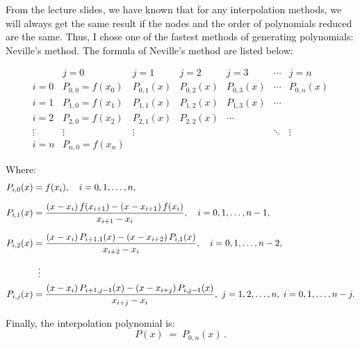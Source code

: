 \documentclass[11pt]{article}
\begin{document}
From the lecture slides, we have known that for any interpolation methods, we will always get the same result if the nodes and
the order of polynomials reduced are the same. Thus, I chose one of the fastest methods of generating polynomials: Neville's method.
The formula of Neville's method are listed below:


\begin{equation}\label{eq:neville-triangle}
\begin{array}{c|cccccc}
   & j=0     & j=1         & j=2           & j=3           & \cdots & j=n      \\ \hline
i=0 & P_{0,0}=f(x_0)
       & P_{0,1}(x)
                    & P_{0,2}(x)
                                  & P_{0,3}(x)
                                                & \cdots & P_{0,n}(x) \\[1ex]
i=1 & P_{1,0}=f(x_1)
       & P_{1,1}(x)
                    & P_{1,2}(x)
                                  & P_{1,3}(x)
                                                & \cdots &          \\[1ex]
i=2 & P_{2,0}=f(x_2)
       & P_{2,1}(x)
                    & P_{2,2}(x)
                                  & \cdots      &        &          \\[1ex]
\vdots
    & \vdots   & \vdots      &             &            & \ddots & \vdots   \\[1ex]
i=n & P_{n,0}=f(x_n)
       &            &             &            &        &          
\end{array}
\end{equation}

Where:  
\begin{align}
P_{i,0}(x) &= f(x_i), 
   \quad i=0,1,\dots,n, \\[6pt]
P_{i,1}(x)
  &= \frac{(x - x_i)\,f(x_{i+1})
         - (x - x_{i+1})\,f(x_i)}{x_{i+1}-x_i},
   \quad i=0,1,\dots,n-1, \\[6pt]
P_{i,2}(x)
  &= \frac{(x - x_i)\,P_{i+1,1}(x)
         - (x - x_{i+2})\,P_{i,1}(x)}
        {x_{i+2}-x_i},
   \quad i=0,1,\dots,n-2, \\[6pt]
&\;\;\vdots \notag\\
P_{i,j}(x)
  &= \frac{(x - x_i)\,P_{i+1,j-1}(x)
         - (x - x_{i+j})\,P_{i,j-1}(x)}
        {x_{i+j}-x_i},
   \ j=1,2,\dots,n,\;i=0,1,\dots,n-j.
\end{align}

Finally, the interpolation polynomial is:
\begin{equation}
P(x)\;=\;P_{0,n}(x)\,.
\end{equation}
\end{document}
